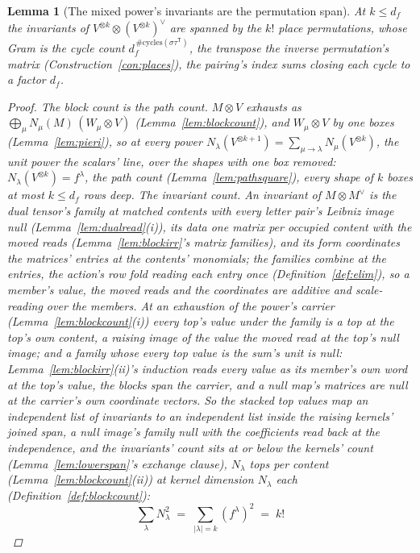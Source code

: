 \documentclass[11pt]{article}
\newtheorem{lemma}{Lemma}
\theoremstyle{definition}
\begin{document}
\begin{lemma}[The mixed power's invariants are the permutation span]
\label{lem:mixedinv}
At $k\le d_f$ the invariants of $V^{\otimes k}\otimes(V^{\otimes k})
^\vee$ are spanned by the $k!$ place permutations, whose Gram is the
cycle count $d_f^{\,\#\mathrm{cycles}(\sigma\tau^{\mathsf T})}$, the
transpose the inverse permutation's matrix
(Construction~\ref{con:places}), the pairing's
index sums closing each cycle to a factor $d_f$.
\begin{proof}
\emph{The block count is the path count.} $M\otimes V$ exhausts as
$\bigoplus_\mu N_\mu(M)\,(W_\mu\otimes V)$
(Lemma~\ref{lem:blockcount}), and $W_\mu\otimes V$ by one boxes
(Lemma~\ref{lem:pieri}), so at every power
$N_\lambda(V^{\otimes k+1})
=\sum_{\mu\to\lambda}N_\mu(V^{\otimes k})$, the
unit power the scalars' line, over the shapes with
one box removed: $N_\lambda(V^{\otimes k})=f^\lambda$, the path count
(Lemma~\ref{lem:pathsquare}), every shape of $k$ boxes at most
$k\le d_f$ rows deep.
\emph{The invariant count.} An invariant of $M\otimes M^\vee$ is
the dual tensor's family at matched contents with every letter
pair's Leibniz image null (Lemma~\ref{lem:dualread}(i)), its data
one matrix per occupied content with the moved reads
(Lemma~\ref{lem:blockirr}'s matrix families), and its form
coordinates the matrices' entries at the contents' monomials; the
families combine at the entries, the action's row fold reading
each entry once (Definition~\ref{def:elim}), so a member's value,
the moved reads and the coordinates are additive and scale-reading
over the members. At an
exhaustion of the power's carrier (Lemma~\ref{lem:blockcount}(i))
every top's value under the family is a top at the top's own
content, a raising image of the value the moved read at the top's
null image; and a family whose every top value is the sum's unit is
null: Lemma~\ref{lem:blockirr}(ii)'s induction reads every value
as its member's own word at the top's value, the blocks span the
carrier, and a null map's matrices are null at the carrier's own
coordinate vectors. So the stacked top values map an independent
list of invariants to an independent list inside the raising
kernels' joined span, a null image's family null with the
coefficients read back at the independence, and the invariants'
count sits at or below the kernels' count
(Lemma~\ref{lem:lowerspan}'s exchange clause), $N_\lambda$ tops per
content (Lemma~\ref{lem:blockcount}(ii)) at kernel dimension
$N_\lambda$ each (Definition~\ref{def:blockcount}):
\[
\sum_\lambda N_\lambda^{2}
\;=\;\sum_{|\lambda|=k}(f^\lambda)^{2}\;=\;k!
\]
\end{proof}
\end{lemma}
\end{document}
